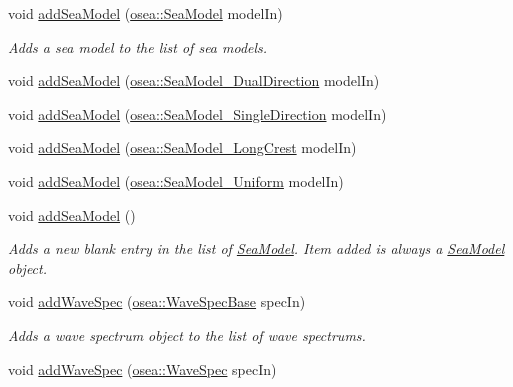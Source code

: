 \begin{DoxyCompactItemize}
void \hyperlink{classosea_1_1ofreq_1_1_system_a96925f84df2a320ab753fa336c6dcec4}{add\-Sea\-Model} (\hyperlink{classosea_1_1_sea_model}{osea\-::\-Sea\-Model} model\-In)
\begin{DoxyCompactList}\small\item\em Adds a sea model to the list of sea models. \end{DoxyCompactList}\item 
void \hyperlink{classosea_1_1ofreq_1_1_system_a006e2c27e1c83a6681b5be43d27dafcc}{add\-Sea\-Model} (\hyperlink{classosea_1_1_sea_model___dual_direction}{osea\-::\-Sea\-Model\-\_\-\-Dual\-Direction} model\-In)
\item 
void \hyperlink{classosea_1_1ofreq_1_1_system_ae1faf08d5089ff3a93d0d6c7ae278e9b}{add\-Sea\-Model} (\hyperlink{classosea_1_1_sea_model___single_direction}{osea\-::\-Sea\-Model\-\_\-\-Single\-Direction} model\-In)
\item 
void \hyperlink{classosea_1_1ofreq_1_1_system_a1ed51b1f50866ddb72958a7bdfc7aa00}{add\-Sea\-Model} (\hyperlink{classosea_1_1_sea_model___long_crest}{osea\-::\-Sea\-Model\-\_\-\-Long\-Crest} model\-In)
\item 
void \hyperlink{classosea_1_1ofreq_1_1_system_a7f16f39333258c11e1d04ddb6713eb5a}{add\-Sea\-Model} (\hyperlink{classosea_1_1_sea_model___uniform}{osea\-::\-Sea\-Model\-\_\-\-Uniform} model\-In)
\item 
void \hyperlink{classosea_1_1ofreq_1_1_system_ac7e1366e40bc98c3198427d8cbe20470}{add\-Sea\-Model} ()
\begin{DoxyCompactList}\small\item\em Adds a new blank entry in the list of \hyperlink{classosea_1_1_sea_model}{Sea\-Model}. Item added is always a \hyperlink{classosea_1_1_sea_model}{Sea\-Model} object. \end{DoxyCompactList}\item 
void \hyperlink{classosea_1_1ofreq_1_1_system_af3935d7cabec21ec783958eff45ccac0}{add\-Wave\-Spec} (\hyperlink{classosea_1_1_wave_spec_base}{osea\-::\-Wave\-Spec\-Base} spec\-In)
\begin{DoxyCompactList}\small\item\em Adds a wave spectrum object to the list of wave spectrums. \end{DoxyCompactList}\item 
void \hyperlink{classosea_1_1ofreq_1_1_system_af0588f7d97a9655bdb8b63678ef1221e}{add\-Wave\-Spec} (\hyperlink{classosea_1_1_wave_spec}{osea\-::\-Wave\-Spec} spec\-In)
\item 

\end{DoxyCompactItemize}
